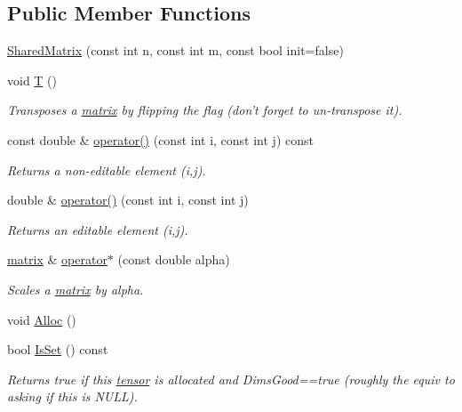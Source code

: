 \subsection*{Public Member Functions}
\begin{DoxyCompactItemize}
\item 
\hyperlink{classJKBuilder_1_1SharedMatrix_af772312dbed003a511b08981c4867a86}{SharedMatrix} (const int n, const int m, const bool init=false)
\item 
void \hyperlink{classJKBuilder_1_1matrix_af2563817f6505e9f8a6ee5c5c209a115}{T} ()
\begin{DoxyCompactList}\small\item\em Transposes a \hyperlink{classJKBuilder_1_1matrix}{matrix} by flipping the flag (don't forget to un-\/transpose it). \item\end{DoxyCompactList}\item 
const double \& \hyperlink{classJKBuilder_1_1matrix_a9ccbac42f4eefb704f04886001f4fb3e}{operator()} (const int i, const int j) const 
\begin{DoxyCompactList}\small\item\em Returns a non-\/editable element (i,j). \item\end{DoxyCompactList}\item 
double \& \hyperlink{classJKBuilder_1_1matrix_a3d7fca183ff1c9f4c160218746f2ef31}{operator()} (const int i, const int j)
\begin{DoxyCompactList}\small\item\em Returns an editable element (i,j). \item\end{DoxyCompactList}\item 
\hyperlink{classJKBuilder_1_1matrix}{matrix} \& \hyperlink{classJKBuilder_1_1matrix_ad4799cbe4a5d07c77f41857a3ce914a2}{operator$\ast$} (const double alpha)
\begin{DoxyCompactList}\small\item\em Scales a \hyperlink{classJKBuilder_1_1matrix}{matrix} by alpha. \item\end{DoxyCompactList}\item 
void \hyperlink{classJKBuilder_1_1tensor_a0ca5cbe96d2a61f06ae4b543ef84f166}{Alloc} ()
\item 
bool \hyperlink{classJKBuilder_1_1tensor_a79c9a36acc5dbeab94033ca97971dc09}{IsSet} () const 
\begin{DoxyCompactList}\small\item\em Returns true if this \hyperlink{classJKBuilder_1_1tensor}{tensor} is allocated and DimsGood==true (roughly the equiv to asking if this is NULL). \item\end{DoxyCompactList}\item 

\end{DoxyCompactItemize}
